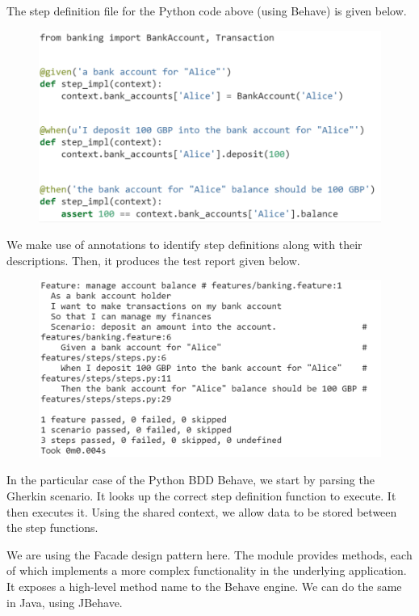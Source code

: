 \documentclass[a4paper, openany]{memoir}
\begin{document}
The step definition file for the Python code above (using Behave) is given below.
\begin{figure}[H]
    \centering
    \includegraphics[scale=0.5]{src/11 BDD Python test Behave.PNG}
\end{figure}
\noindent We make use of annotations to identify step definitions along with their descriptions. Then, it produces the test report given below.
\begin{figure}[H]
    \centering
    \includegraphics[scale=0.5]{src/11 BDD Python test result Behave.PNG}
\end{figure}

In the particular case of the Python BDD Behave, we start by parsing the Gherkin scenario. It looks up the correct step definition function to execute. It then executes it. Using the shared context, we allow data to be stored between the step functions.

We are using the Facade design pattern here. The module provides methods, each of which implements a more complex functionality in the underlying application. It exposes a high-level method name to the Behave engine. We can do the same in Java, using JBehave.
\end{document}
